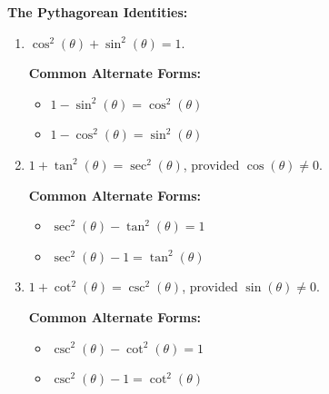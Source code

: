 \documentclass{ximera}
\begin{document}
\begin{theorem} \label{pythids}  \textbf{The Pythagorean Identities:} 

\begin{enumerate}

\item $\cos^{2}(\theta) + \sin^{2}(\theta) = 1$.

\textbf{Common Alternate Forms:}

\begin{itemize}

\item  $1 - \sin^{2}(\theta) = \cos^{2}(\theta)$

\item  $1 - \cos^{2}(\theta) = \sin^{2}(\theta)$

\end{itemize}

\item $1 + \tan^{2}(\theta) = \sec^{2}(\theta)$, provided $\cos(\theta) \neq 0$.

\textbf{Common Alternate Forms:}

\begin{itemize}

\item  $\sec^{2}(\theta) - \tan^{2}(\theta) = 1$

\item  $\sec^{2}(\theta) - 1 = \tan^{2}(\theta)$

\end{itemize}

\item $1 + \cot^{2}(\theta) = \csc^{2}(\theta)$, provided $\sin(\theta) \neq 0$.

\textbf{Common Alternate Forms:}

\begin{itemize}

\item  $\csc^{2}(\theta) - \cot^{2}(\theta) = 1$

\item  $\csc^{2}(\theta) - 1 = \cot^{2}(\theta)$

\end{itemize}

\end{enumerate}

\smallskip

\end{theorem}

\end{document}
